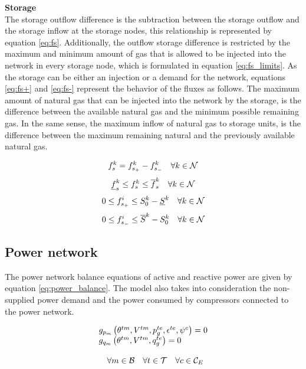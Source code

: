 \textbf{Storage}\\

The storage outflow difference is the subtraction between the storage outflow and the storage inflow at the storage nodes, this relationship is represented by equation \ref{eq:fs}. Additionally, the outflow storage difference is restricted by the maximum and minimum amount of gas that is allowed to be injected into the network in every storage node, which is formulated in equation \ref{eq:fs_limits}. As the storage can be either an injection or a demand for the network, equations \ref{eq:fs+} and \ref{eq:fs-} represent the behavior of the fluxes as follows. The maximum amount of natural gas that can be injected into the network by the storage, is the difference between the available natural gas and the minimum possible remaining gas. In the same sense, the maximum inflow of natural gas to storage units, is the difference between the maximum remaining natural  and the previously available natural gas.

\begin{equation}
f_{s}^{k} = f_{s_+}^{k}  - f_{s_-}^{k}\quad \forall k \in \cal{N}
\label{eq:fs}
\end{equation}
\begin{equation}
\underline{f}^{k}_{s} \le f^{k}_{s} \le \overline{f}^{k}_{s} \quad \forall k \in \cal{N}
\label{eq:fs_limits}
\end{equation}
\begin{equation}
0 \le f_{s_+}^{i} \le S^{k}_{0}  - \underline{S}^{k} \quad \forall k \in \cal{N}
\label{eq:fs+}
\end{equation}
\begin{equation}
0 \le f_{s_-}^{i} \le \overline{S}^{k} - S^{k}_{0} \quad \forall k \in \cal{N}
\label{eq:fs-}
\end{equation}

\subsection{Power network}

The power network balance equations of active and reactive power are given by equation \ref{eq:power_balance}. The model also takes into consideration the non-supplied power demand and the power consumed by compressors connected to the power network.
 
\begin{equation}
\begin{array}{l}
g_{p_m}\left(\theta^{tm}, V^{tm}, p_{g}^{te}, \epsilon^{te}, \psi^{c}\right) = 0\\
g_{q_m}\left(\theta^{tm}, V^{tm}, q_{g}^{te}\right) = 0\\
\\
\quad \forall m \in {\cal{B}} \quad \forall t  \in {\cal{T}} \quad \forall c  \in {\cal{C}}_{E}  
\end{array}
\label{eq:power_balance}
\end{equation}


